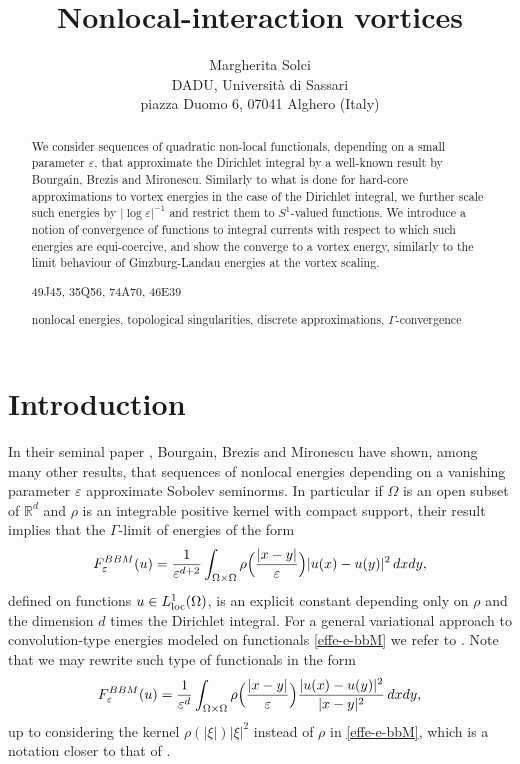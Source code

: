 \documentclass[11pt]{article}
\title{Nonlocal-interaction vortices}
\author{Margherita Solci\\ 
{\small DADU, Universit\`a di Sassari}\\ {\small piazza Duomo 6, 07041 Alghero (Italy)}}
\date{}
\def\e{\varepsilon}
\def\dxy{\,dx dy}
\begin{document}
 

\maketitle

\begin{abstract} We consider sequences of quadratic non-local functionals, depending on a small parameter $\e$, that approximate the Dirichlet integral by a well-known result by Bourgain, Brezis and Mironescu. Similarly to what is done for hard-core approximations to vortex energies in the case of the Dirichlet integral, we further scale such energies by $|\log\e|^{-1}$ and restrict them to $S^1$-valued functions. We introduce a notion of convergence of functions to integral currents with respect to which such energies are equi-coercive, and show the converge to a vortex energy, similarly to the limit behaviour of Ginzburg-Landau energies at the vortex scaling.

\medskip
{} 49J45, 35Q56, 74A70, 46E39

\medskip
{} nonlocal energies, topological singularities, discrete approximations, $\Gamma$-convergence
\end{abstract}

\section{Introduction}
In their seminal paper \cite{BBM}, Bourgain, Brezis and Mironescu have shown, among many other results, that sequences of nonlocal energies depending on a vanishing  parameter $\e$ approximate Sobolev seminorms. In particular if $\Omega$ is an open subset of $\mathbb R^d$ and $\rho$ is an integrable positive kernel with compact support, their result implies that the $\Gamma$-limit of 
energies of the form
\begin{equation}\label{effe-e-bbM} F^{BBM}_\e(u)=
{1\over\e^{d+2}} \int_{\Omega\times\Omega}\rho\Bigl({|x-y|\over\e}\Bigr) {|u(x)-u(y)|^2}\dxy,
\end{equation}
defined on functions $u\in L^1_{\rm loc} (\Omega)$, is an explicit constant depending only on $\rho$ and the dimension $d$ times the Dirichlet integral. For a general variational approach to convolution-type energies modeled on functionals \eqref{effe-e-bbM} we refer to \cite{AABPT}. Note that we may rewrite such type of functionals in the form 
\begin{equation}\label{BBM2} F^{BBM}_\e(u)=
{1\over\e^d} \int_{\Omega\times\Omega}\rho\Bigl({|x-y|\over\e}\Bigr) {|u(x)-u(y)|^2\over|x-y|^2}\dxy,
\end{equation}
up to considering the kernel $\rho(|\xi|)|\xi|^2$ instead of $\rho$ in \eqref{effe-e-bbM}, which is a notation closer to that of \cite{BBM}. 
\end{document}
